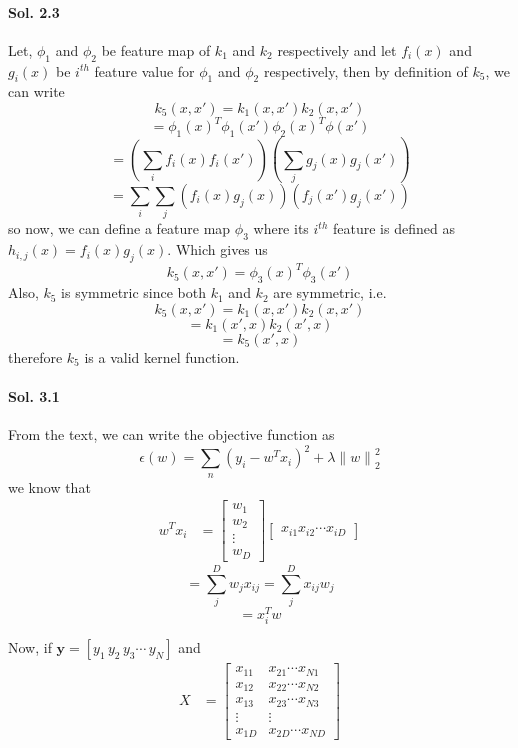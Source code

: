 \documentclass[]{report}
\begin{document}
\paragraph{Sol. 2.3}
	Let, $\phi_1$ and $\phi_2$ be feature map of $k_1$ and $k_2$ respectively and let $f_i (x)$ and $g_i (x)$ be $i^{th}$ feature value for 
	$\phi_1$ and $\phi_2$ respectively, then by definition of $k_5$, we can write
	\[ k_5 (x, x') = k_1 (x, x') k_2 (x, x') \]
	\[ = {\phi_1 (x)}^T \phi_1 (x') {\phi_2 (x)}^T \phi(x') \]
	\[ = (\sum_{i} f_i (x) f_i (x')) (\sum_{j} g_j (x) g_j (x')) \]
	\[ = \sum_i \sum_j (f_i (x) g_j (x)) (f_j (x') g_j (x'))\]
	so now, we can define a feature map $\phi_3$ where its $i^{th}$ feature is defined as $h_{i, j}(x) = f_i (x) g_j (x)$. Which gives us
	\[ k_5 (x, x') = {\phi_3 (x)}^T \phi_3 (x')\]
	Also, $k_5$ is symmetric since both $k_1$ and $k_2$ are symmetric, i.e.
	\[ k_5 (x, x') = k_1 (x, x') k_2 (x, x') \]
	\[ = k_1 (x', x) k_2 (x', x) \]
	\[ = k_5 (x', x) \]
	therefore $k_5$ is a valid kernel function.

\paragraph{Sol. 3.1}
	From the text, we can write the objective function as 
	\[ \epsilon(w) = \sum_n (y_i - w^T x_i)^2 + \lambda {\| w \|}_2^2 \]
	we know that
	\begin{align}
    	w^T x_i &= \begin{bmatrix}
           w_1 \\
           w_2 \\
           \vdots \\
           w_D
         \end{bmatrix} \begin{bmatrix}x_{i1} x_{i2} \cdots x_{iD} \end{bmatrix}
  	\end{align}
  	\[ = \sum_j^D w_j x_{ij} = \sum_j^D x_{ij} w_j \]
  	\[ = x_i^T w \]

  	Now, if $\textbf{y} = [y_1 \, y_2 \, y_3 \cdots \, y_N]$ and
  	\begin{align}
    	X &= \begin{bmatrix}
           x_{11} & x_{21} \cdots x_{N1}\\
           x_{12} & x_{22} \cdots x_{N2}\\
           x_{13} & x_{23} \cdots x_{N3}\\
           \vdots & \vdots  \\
           x_{1D} & x_{2D} \cdots x_{ND}
         \end{bmatrix}
  	\end{align}
  	
\end{document}
